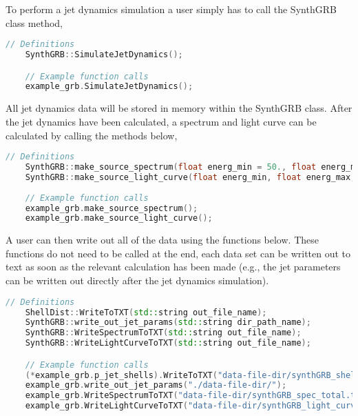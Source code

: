 \documentclass[linenumbers]{aastex631}
\begin{document}
To perform a jet dynamics simulation a user simply has to call the SynthGRB class method, 

\begin{lstlisting}[language = C++, caption = Perform Jet Dynamics Simulation, label={lst: perform simulation}]
    // Definitions
    SynthGRB::SimulateJetDynamics();

    // Example function calls
    example_grb.SimulateJetDynamics();

\end{lstlisting}

All jet dynamics data will be stored in memory within the SynthGRB class. After the jet dynamics have been calculated, a spectrum and light curve can be calculated by calling the methods below, 

\begin{lstlisting}[language = C++, caption = Create Spectrum and Light Curve from Jet Simulation, label={lst: create spectrum and light curve}]
    // Definitions
    SynthGRB::make_source_spectrum(float energ_min = 50., float energ_max = 350., int num_energ_bins = 50, float tmin = 0., float tmax = 30., std::string comp = "all");
    SynthGRB::make_source_light_curve(float energ_min, float energ_max, float Tstart, float Tend, float dt, std::string comp = "all", bool logscale = false);
    
    // Example function calls
    example_grb.make_source_spectrum();
    example_grb.make_source_light_curve();
\end{lstlisting}

A user can then write out all of the data using the functions below. These functions do not need to be called at the end, each data set can be written out to text as soon as the relevant calculation has been made (e.g., the jet parameters can be written out directly after the jet dynamics simulation).

\begin{lstlisting}[language = C++, caption = Write Out Data to Text Files, label={lst: write to text files}]
    // Definitions
    ShellDist::WriteToTXT(std::string out_file_name);
    SynthGRB::write_out_jet_params(std::string dir_path_name);
    SynthGRB::WriteSpectrumToTXT(std::string out_file_name);
    SynthGRB::WriteLightCurveToTXT(std::string out_file_name);

    // Example function calls
    (*example_grb.p_jet_shells).WriteToTXT("data-file-dir/synthGRB_shell_dist.txt");
    example_grb.write_out_jet_params("./data-file-dir/");
    example_grb.WriteSpectrumToTXT("data-file-dir/synthGRB_spec_total.txt");
    example_grb.WriteLightCurveToTXT("data-file-dir/synthGRB_light_curve.txt");
\end{lstlisting}
\end{document}
